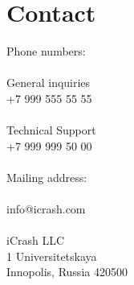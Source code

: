 \section{Contact}
Phone numbers:\\
\\
General inquiries\\
+7 999 555 55 55\\
\\
Technical Support\\
+7 999 999 50 00\\
\\
Mailing address:\\
\\
info@icrash.com\\
\\
iCrash LLC\\
1 Universitetskaya\\
Innopolis, Russia 420500